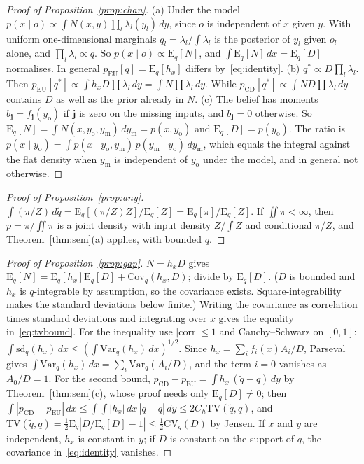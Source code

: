 \documentclass[10pt,a4paper]{article}
\newcommand{\pcd}{p_{\mathrm{CD}}}
\newcommand{\peu}{p_{\mathrm{EU}}}
\newcommand{\Eq}{\mathrm{E}_q}
\newcommand{\Var}{\mathrm{Var}}
\newcommand{\Cov}{\mathrm{Cov}}
\newcommand{\sd}{\mathrm{sd}}
\newcommand{\TV}{\mathrm{TV}}
\newcommand{\CV}{\mathrm{CV}_q}
\newcommand{\yo}{y_{\mathrm{o}}}
\newcommand{\ym}{y_{\mathrm{m}}}
\theoremstyle{upright}
\begin{document}
\begin{proof}[Proof of Proposition~\ref{prop:chan}]
(a) Under the model $p(x\mid o)\propto\int N(x,y)\prod_l\lambda_l(y_l)\,dy$, since $o$ is independent of $x$ given $y$. With uniform one-dimensional marginals $q_l=\lambda_l/\int\lambda_l$ is the posterior of $y_l$ given $o_l$ alone, and $\prod_l\lambda_l\propto q$. So $p(x\mid o)\propto\Eq[N]$, and $\int\Eq[N]\,dx=\Eq[D]$ normalises. In general $\peu[q]=\Eq[h_x]$ differs by~\eqref{eq:identity}.
(b) $q^\ast\propto D\prod_l\lambda_l$. Then $\peu[q^\ast]\propto\int h_xD\prod\lambda_l\,dy=\int N\prod\lambda_l\,dy$. While $\pcd[q^\ast]\propto\int ND\prod\lambda_l\,dy$ contains $D$ as well as the prior already in $N$.
(c) The belief has moments $b_{\mathbf{j}}=f_{\mathbf{j}}(\yo)$ if $\mathbf{j}$ is zero on the missing inputs, and $b_{\mathbf{j}}=0$ otherwise. So $\Eq[N]=\int N(x,\yo,\ym)\,d\ym=p(x,\yo)$ and $\Eq[D]=p(\yo)$. The ratio is $p(x\mid \yo)=\int p(x\mid \yo,\ym)\,p(\ym\mid \yo)\,d\ym$, which equals the integral against the flat density when $\ym$ is independent of $\yo$ under the model, and in general not otherwise.
\end{proof}

\begin{proof}[Proof of Proposition~\ref{prop:any}]
$\int(\pi/Z)\,d\tilde q=\Eq[(\pi/Z)Z]/\Eq[Z]=\Eq[\pi]/\Eq[Z]$. If $\iint \pi<\infty$, then $p=\pi/\iint \pi$ is a joint density with input density $Z/\int Z$ and conditional $\pi/Z$, and Theorem~\ref{thm:sem}(a) applies, with bounded $q$.
\end{proof}

\begin{proof}[Proof of Proposition~\ref{prop:gap}]
$N=h_xD$ gives $\Eq[N]=\Eq[h_x]\Eq[D]+\Cov_q(h_x,D)$; divide by $\Eq[D]$. ($D$ is bounded and $h_x$ is $q$-integrable by assumption, so the covariance exists. Square-integrability makes the standard deviations below finite.) Writing the covariance as correlation times standard deviations and integrating over $x$ gives the equality in~\eqref{eq:tvbound}. For the inequality use $|\mathrm{corr}|\leq1$ and Cauchy--Schwarz on $[0,1]$: $\int\sd_q(h_x)\,dx\leq(\int\Var_q(h_x)\,dx)^{1/2}$. Since $h_x=\sum_if_i(x)A_i/D$, Parseval gives $\int\Var_q(h_x)\,dx=\sum_i\Var_q(A_i/D)$, and the term $i=0$ vanishes as $A_0/D=1$. For the second bound, $\pcd-\peu=\int h_x\,(\tilde q-q)\,dy$ by Theorem~\ref{thm:sem}(c), whose proof needs only $\Eq[D]\neq0$; then $\int|\pcd-\peu|\,dx\leq\int\!\int|h_x|\,dx\,|\tilde q-q|\,dy\leq2C_h\TV(\tilde q,q)$, and $\TV(\tilde q,q)=\frac12\Eq|D/\Eq[D]-1|\leq\frac12\CV(D)$ by Jensen. If $x$ and $y$ are independent, $h_x$ is constant in $y$; if $D$ is constant on the support of $q$, the covariance in~\eqref{eq:identity} vanishes.
\end{proof}
\end{document}
